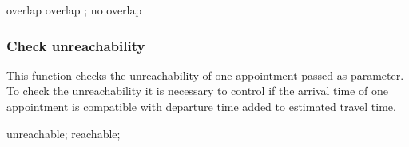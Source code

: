 \begin{algorithmic}
	
			\State \Return overlap
			\State \Return overlap
		\EndIf;
		\State \Return no overlap
	\EndFunction
\end{algorithmic}

\subsubsection{Check unreachability}

This function checks the unreachability of one appointment passed as parameter.
To check the unreachability it is necessary to control if the arrival time of one appointment is compatible with departure time added to estimated travel time.

\begin{algorithmic}
	
			\State \Return unreachable;
		\Else 
			\State \Return reachable;
		\EndIf
	\EndFunction
\end{algorithmic}

